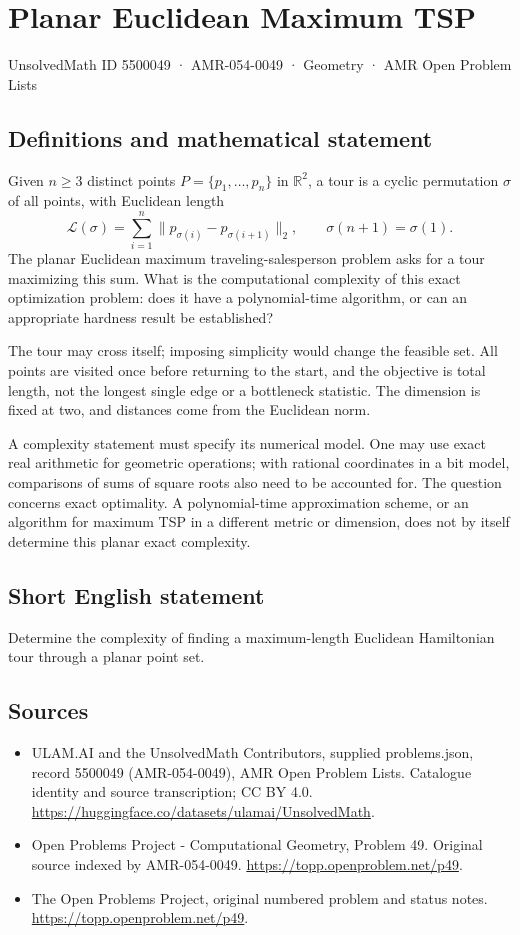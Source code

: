 \documentclass[11pt,a4paper]{article}
\begin{document}
\section*{Planar Euclidean Maximum TSP}\label{5500049}
{\small UnsolvedMath ID 5500049 · AMR-054-0049 · Geometry · AMR Open Problem Lists}
\subsection{Definitions and mathematical statement}
Given $n\ge3$ distinct points $P=\{p_1,\ldots,p_n\}$ in
$\mathbb R^2$, a tour is a cyclic permutation $\sigma$ of all
points, with Euclidean length
\[
  \mathcal L(\sigma)=\sum_{i=1}^{n}
          \|p_{\sigma(i)}-p_{\sigma(i+1)}\|_2,
                    \qquad\sigma(n+1)=\sigma(1).
\]
The planar Euclidean maximum traveling-salesperson problem
asks for a tour maximizing this sum. What is the computational
complexity of this exact optimization problem: does it have
a polynomial-time algorithm, or can an appropriate hardness
result be established?

The tour may cross itself; imposing simplicity would change
the feasible set. All points are visited once before returning
to the start, and the objective is total length, not the longest
single edge or a bottleneck statistic. The dimension is fixed
at two, and distances come from the Euclidean norm.

A complexity statement must specify its numerical model.
One may use exact real arithmetic for geometric operations;
with rational coordinates in a bit model, comparisons of sums
of square roots also need to be accounted for. The question
concerns exact optimality. A polynomial-time approximation
scheme, or an algorithm for maximum TSP in a different metric
or dimension, does not by itself determine this planar exact
complexity.
\subsection{Short English statement}
Determine the complexity of finding a maximum-length Euclidean Hamiltonian tour through a planar point set.
\subsection{Sources}
\begin{itemize}
\item[S1] ULAM.AI and the UnsolvedMath Contributors, supplied problems.json, record 5500049 (AMR-054-0049), AMR Open Problem Lists. Catalogue identity and source transcription; CC BY 4.0.
\url{https://huggingface.co/datasets/ulamai/UnsolvedMath}.
\item[S2] Open Problems Project - Computational Geometry, Problem 49. Original source indexed by AMR-054-0049.
\url{https://topp.openproblem.net/p49}.
\item[S3] The Open Problems Project, original numbered problem and status notes.
\url{https://topp.openproblem.net/p49}.
\end{itemize}
\end{document}
